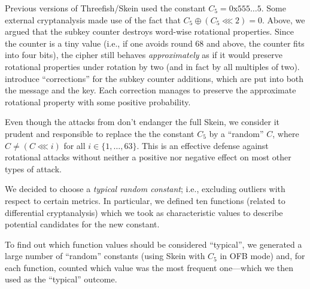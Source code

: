 \documentclass[11pt,twoside]{article}
\newcommand{\xor}{\oplus}
\newcommand{\rol}{\mathbin{\lll}}
\begin{document}
Previous versions of Threefish/Skein used the constant 
$C_5=\text{0x555\ldots5}$. Some external cryptanalysis \cite{KN10,RKN10} made use of
the fact that $C_5 \xor (C_5 \rol 2) = 0$. Above, we argued that the subkey
counter destroys word-wise rotational properties. Since the counter is a tiny 
value (i.e., if one avoids round 68 and above, the counter fits into four bits),
the cipher still behaves \emph{approximately} as if it would preserve
rotational properties under rotation by two (and in fact by all multiples of
two). \cite{KN10,RKN10} introduce ``corrections'' for the subkey 
counter additions, which are put into both the message and the key. Each 
correction manages to preserve the approximate rotational property with some
positive probability. 

Even though the attacks from \cite{KN10,RKN10} don't endanger the full Skein, 
we consider it prudent and responsible to replace the the constant $C_5$ by 
a ``random'' $C$, where $C \neq (C \rol i)$ for all $i \in \{1, \ldots, 63\}$.
This is an effective defense against rotational attacks without neither
a positive nor negative effect on most other types of attack. 


We decided to choose a \emph{typical random constant}; i.e., excluding
outliers with respect to certain metrics.  In particular, we defined ten
functions (related to differential cryptanalysis) which we took as
characteristic values to describe potential candidates for the new
constant. 

To find out which function values should be considered ``typical'',  
we generated a large number of ``random'' constants (using Skein with
$C_5$ in OFB mode) and, for each function, counted which value
was the most frequent one---which we then used as the ``typical''
outcome.
\end{document}

